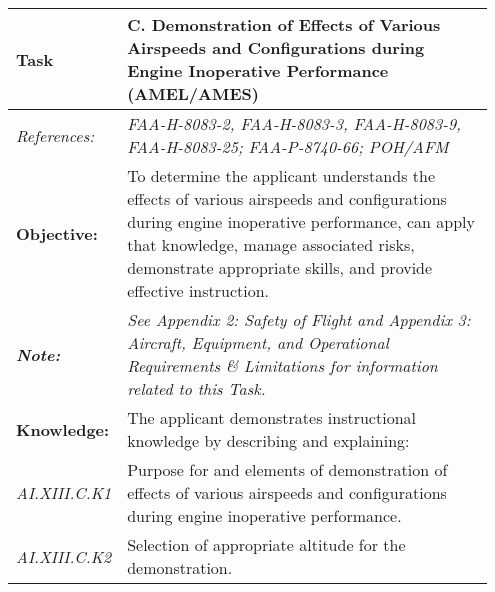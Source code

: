 {\begin{table}[]
\begin{tabular}%
  {>{\raggedleft\arraybackslash}p{0.15\linewidth}%
   >{\raggedright\arraybackslash}p{0.8\linewidth}%
  }
\textbf{Task}                                                       & \textbf{C. Demonstration of Effects of Various Airspeeds and Configurations during Engine Inoperative Performance (AMEL/AMES)}                                                                                                                      \\ \hline
\textit{References:}                                                & \textit{FAA-H-8083-2, FAA-H-8083-3, FAA-H-8083-9, FAA-H-8083-25; FAA-P-8740-66; POH/AFM}                                                                                                                                                                \\
\textbf{Objective:}                                                 & To determine the applicant understands the effects of various airspeeds and configurations during engine inoperative performance, can apply that knowledge, manage associated risks, demonstrate appropriate skills, and provide effective instruction. \\
\textit{\textbf{Note:}}                                             & \textit{See Appendix 2: Safety of Flight and Appendix 3: Aircraft, Equipment, and Operational Requirements \& Limitations for information related to this Task.}                                                                                        \\ \hline
\textbf{Knowledge:}                                                 & The applicant demonstrates instructional knowledge by describing and explaining:                                                                                                                                                                        \\
\textit{AI.XIII.C.K1}                                               & Purpose for and elements of demonstration of effects of various airspeeds and configurations during engine inoperative performance.                                                                                                                     \\
\textit{AI.XIII.C.K2}                                               & Selection of appropriate altitude for the demonstration.                                                                                                                                                                                                \\

\end{tabular}
\end{table}}
